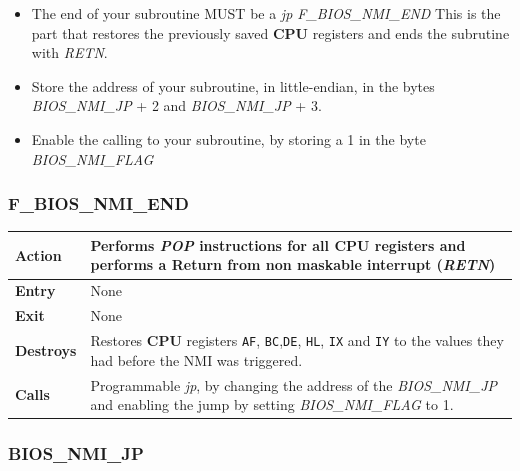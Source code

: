 \documentclass[a4paper,11pt]{article}
\begin{document}
    \begin{itemize}
        \item The end of your subroutine MUST be a \textit{jp F\_BIOS\_NMI\_END}
        This is the part that restores the previously saved \textbf{CPU}
        registers and ends the subrutine with \textit{RETN}.
        \item Store the address of your subroutine, in little-endian, in the
        bytes \textit{BIOS\_NMI\_JP} + 2 and \textit{BIOS\_NMI\_JP} + 3.
        \item Enable the calling to your subroutine, by storing a 1 in the byte
        \textit{BIOS\_NMI\_FLAG}
    \end{itemize}

    \subsubsection{F\_BIOS\_NMI\_END}
    \label{func:fbiosnmiend}
    \begin{tabular}{l p{9cm}}
        \hline\textbf{Action}
        & Performs \textit{POP} instructions for all \textbf{CPU} registers and
        performs a Return from non maskable interrupt (\textit{RETN})\\
        \hline\textbf{Entry} & None\\
        \hline\textbf{Exit} & None\\
        \hline\textbf{Destroys} & Restores \textbf{CPU} registers \texttt{AF},
        \texttt{BC},\texttt{DE}, \texttt{HL}, \texttt{IX} and \texttt{IY} to the
        values they had before the NMI was triggered.\\
        \hline\textbf{Calls} & Programmable \textit{jp}, by changing the address
        of the \textit{BIOS\_NMI\_JP} and enabling the jump by setting 
        \textit{BIOS\_NMI\_FLAG} to 1.\\
        \hline
    \end{tabular}

    \subsubsection{BIOS\_NMI\_JP}
    \label{func:fbiosnmijp}
\end{document}
